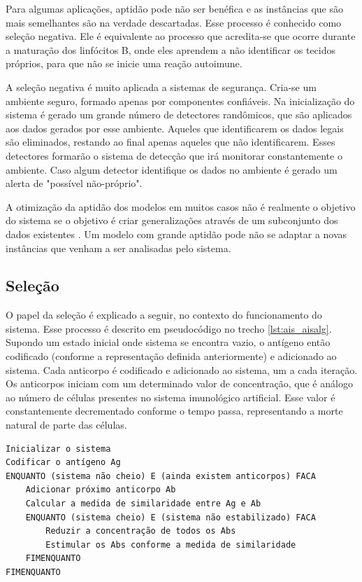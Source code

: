 Para algumas aplicações, aptidão pode não ser benéfica e as instâncias que são mais semelhantes são na verdade descartadas. Esse processo é conhecido como seleção negativa. Ele é equivalente ao processo que acredita-se que ocorre durante a maturação dos linfócitos B, onde eles aprendem a não identificar os tecidos próprios, para que não se inicie uma reação autoimune.

A seleção negativa é muito aplicada a sistemas de segurança. Cria-se um ambiente seguro, formado apenas por componentes confiáveis. Na inicialização do sistema é gerado um grande número de detectores randômicos, que são aplicados aos dados gerados por esse ambiente. Aqueles que identificarem os dados legais são eliminados, restando ao final apenas aqueles que não identificarem. Esses detectores formarão o sistema de detecção que irá monitorar constantemente o ambiente. Caso algum detector identifique os dados no ambiente é gerado um alerta de "possível não-próprio".

A otimização da aptidão dos modelos em muitos casos não é realmente o objetivo do sistema se o objetivo é criar generalizações através de um subconjunto dos dados existentes \cite{Hand2001}. Um modelo com grande aptidão pode não se adaptar a novas instâncias que venham a ser analisadas pelo sistema.

\subsection{Seleção}

O papel da seleção é explicado a seguir, no contexto do funcionamento do sistema. Esse processo é descrito em pseudocódigo no trecho \ref{lst:ais_aisalg}. Supondo um estado inicial onde sistema se encontra vazio, o antígeno então codificado (conforme a representação definida anteriormente) e adicionado ao sistema. Cada anticorpo é codificado e adicionado ao sistema, um a cada iteração. Os anticorpos iniciam com um determinado valor de concentração, que é análogo ao número de células presentes no sistema imunológico artificial. Esse valor é constantemente decrementado conforme o tempo passa, representando a morte natural de parte das células.

\vspace{1cm}
\begin{lstlisting}[caption=Pseudo código de um Sistema Imunológico Artificial \cite{Aickelin2005},label=lst:ais_aisalg]
Inicializar o sistema
Codificar o antígeno Ag
ENQUANTO (sistema não cheio) E (ainda existem anticorpos) FACA
    Adicionar próximo anticorpo Ab
    Calcular a medida de similaridade entre Ag e Ab
    ENQUANTO (sistema cheio) E (sistema não estabilizado) FACA
        Reduzir a concentração de todos os Abs
        Estimular os Abs conforme a medida de similaridade
    FIMENQUANTO
FIMENQUANTO
\end{lstlisting}

